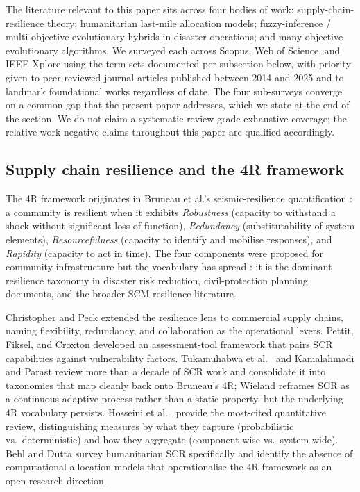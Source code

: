 \documentclass[applsci,article,submit,moreauthors,pdftex]{Definitions/mdpi}
\begin{document}
The literature relevant to this paper sits across four bodies of work:
supply-chain-resilience theory; humanitarian last-mile allocation models;
fuzzy-inference / multi-objective evolutionary hybrids in disaster
operations; and many-objective evolutionary algorithms. We surveyed
each across Scopus, Web of Science, and IEEE Xplore using the term sets
documented per subsection below, with priority given to peer-reviewed
journal articles published between 2014 and 2025 and to landmark
foundational works regardless of date. The four sub-surveys converge on
a common gap that the present paper addresses, which we state at the end
of the section. We do not claim a systematic-review-grade exhaustive
coverage; the relative-work negative claims throughout this paper are
qualified accordingly.

\subsection{Supply chain resilience and the 4R framework}\label{sec:related-scr}

The 4R framework originates in Bruneau et al.'s seismic-resilience
quantification \cite{bruneau2003}: a community is resilient when it exhibits
\emph{Robustness} (capacity to withstand a shock without significant loss
of function), \emph{Redundancy} (substitutability of system elements),
\emph{Resourcefulness} (capacity to identify and mobilise responses), and
\emph{Rapidity} (capacity to act in time). The four components were
proposed for community infrastructure but the vocabulary has spread
\cite{hosseini2016}: it is the dominant resilience taxonomy in disaster
risk reduction, civil-protection planning documents, and the broader
SCM-resilience literature.

Christopher and Peck \cite{christopher2004} extended the resilience lens
to commercial supply chains, naming flexibility, redundancy, and
collaboration as the operational levers. Pettit, Fiksel, and Croxton
\cite{pettit2010, pettit2013} developed an assessment-tool framework
that pairs SCR capabilities against vulnerability factors. Tukamuhabwa
et al.\ \cite{tukamuhabwa2015} and Kamalahmadi and Parast
\cite{kamalahmadi2016} review more than a decade of SCR work and
consolidate it into taxonomies that map cleanly back onto Bruneau's
4R; Wieland \cite{wieland2021} reframes SCR as a continuous adaptive
process rather than a static property, but the underlying 4R
vocabulary persists. Hosseini et al.\ \cite{hosseini2016} provide the
most-cited quantitative review, distinguishing measures by what they
capture (probabilistic vs.\ deterministic) and how they aggregate
(component-wise vs.\ system-wide). Behl and Dutta \cite{behl2019}
survey humanitarian SCR specifically and identify the absence of
computational allocation models that operationalise the 4R framework
as an open research direction.
\end{document}
